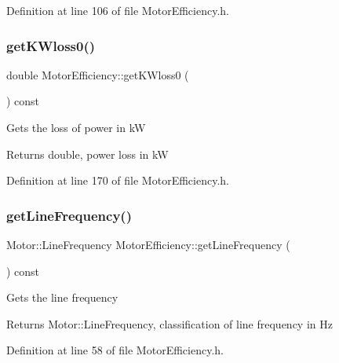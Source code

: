 Definition at line 106 of file Motor\+Efficiency.\+h.

\mbox{\label{class_motor_efficiency_a47398ac8203f5b79a0ca435673a4bc16}} 
\subsubsection{\texorpdfstring{get\+K\+Wloss0()}{getKWloss0()}}
{\footnotesize\ttfamily double Motor\+Efficiency\+::get\+K\+Wloss0 (\begin{DoxyParamCaption}{ }\end{DoxyParamCaption}) const\hspace{0.3cm}{\ttfamily [inline]}}

Gets the loss of power in kW \begin{DoxyReturn}{Returns}
double, power loss in kW 
\end{DoxyReturn}


Definition at line 170 of file Motor\+Efficiency.\+h.

\mbox{\label{class_motor_efficiency_a3cc0ed606154a04d035399e05d1cb02a}} 
\subsubsection{\texorpdfstring{get\+Line\+Frequency()}{getLineFrequency()}}
{\footnotesize\ttfamily Motor\+::\+Line\+Frequency Motor\+Efficiency\+::get\+Line\+Frequency (\begin{DoxyParamCaption}{ }\end{DoxyParamCaption}) const\hspace{0.3cm}{\ttfamily [inline]}}

Gets the line frequency \begin{DoxyReturn}{Returns}
Motor\+::\+Line\+Frequency, classification of line frequency in Hz 
\end{DoxyReturn}


Definition at line 58 of file Motor\+Efficiency.\+h.

\mbox{\label{class_motor_efficiency_a955906509a4b49274b35c1b119c4a4b4}} 
